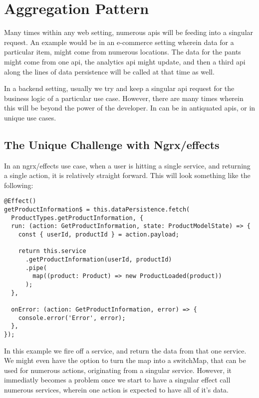 \maketitle{}
\section{ Aggregation Pattern }

Many times within any web setting, numerous apis will be feeding into a singular
request. An example would be in an e-commerce setting wherein data for a
particular item, might come from numerous locations. The data for the pants
might come from one api, the analytics api might update, and then a third api
along the lines of data persistence will be called at that time as well.

In a backend setting, usually we try and keep a singular api request for the
business logic of a particular use case. However, there are many times wherein
this will be beyond the power of the developer. In can be in antiquated apis,
or in unique use cases.

\subsection{ The Unique Challenge with Ngrx/effects}
In an ngrx/effects use case, when a user is hitting a single service, and
returning a single action, it is relatively straight forward. This will look
something like the following:
\begin{lstlisting}
@Effect()
getProductInformation$ = this.dataPersistence.fetch(
  ProductTypes.getProductInformation, {
  run: (action: GetProductInformation, state: ProductModelState) => {
    const { userId, productId } = action.payload;

    return this.service
      .getProductInformation(userId, productId)
      .pipe(
        map((product: Product) => new ProductLoaded(product))
      );
  },

  onError: (action: GetProductInformation, error) => {
    console.error('Error', error);
  },
});
\end{lstlisting}

In this example we fire off a service, and return the data from that one
service. We might even have the option to turn the map into a switchMap, that
can be used for numerous actions, originating from a singular service. However,
it immediatly becomes a problem once we start to have a singular effect call
numerous services, wherein one action is expected to have all of it's data.

